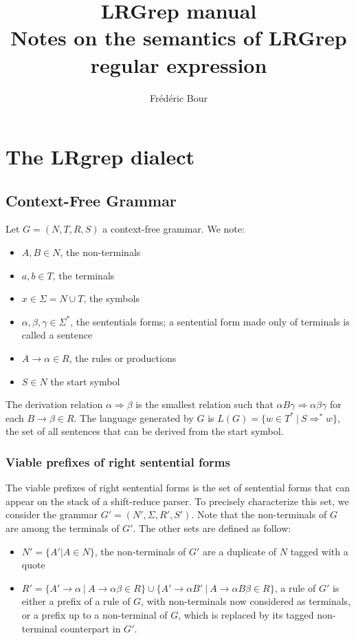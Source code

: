\documentclass{article}
\title{LRGrep manual \\
  Notes on the semantics of LRGrep regular expression}
\author{Frédéric Bour}
\begin{document}
\maketitle

\section{The LRgrep dialect}

\subsection{Context-Free Grammar}

Let $G = (N, T, R, S)$ a context-free grammar. We note:
\begin{itemize}
  \item $A, B \in N$, the non-terminals
  \item $a, b \in T$, the terminals
  \item $x \in \Sigma = N \cup T$, the symbols
  \item $\alpha, \beta, \gamma \in \Sigma^*$, the sententials forms; a sentential form made only of terminals is called a sentence
  \item $A \rightarrow \alpha \in R$, the rules or productions
  \item $S \in N$ the start symbol
\end{itemize}

The derivation relation $\alpha\Rightarrow\beta$ is the smallest relation such that $\alpha B \gamma \Rightarrow \alpha\beta\gamma$ for each $B\rightarrow \beta \in R$.
The language generated by $G$ is $L(G) = \{w \in T^*\ |\ S \Rightarrow^* w\}$, the set of all sentences that can be derived  from the start symbol.

\subsubsection{Viable prefixes of right sentential forms}


The viable prefixes of right sentential forms is the set of sentential forms that can appear on the stack of a shift-reduce parser.
To precisely characterize this set, we consider the grammar $G' = (N', \Sigma, R', S')$. Note that the non-terminals of $G$ are among the terminals of $G'$. The other sets are defined as follow:
\begin{itemize}
  \item $N' = \{ A' | A \in N \}$, the non-terminals of $G'$ are a duplicate of $N$ tagged with a quote
  \item $R' = \{ A' \rightarrow \alpha\ |\ A \rightarrow \alpha\beta \in R\}
         \cup \{ A' \rightarrow \alpha B'\ |\ A \rightarrow \alpha B \beta \in R\}$, a rule of $G'$ is either a prefix of a rule of $G$, with non-terminals now considered as terminals, or a prefix up to a non-terminal of $G$, which is replaced by its tagged non-terminal counterpart in $G'$.
\end{itemize}
\end{document}
